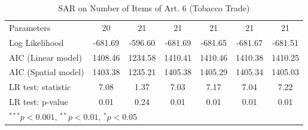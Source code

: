 \begin{table}[!h]
\begin{center}
\begin{tabular}{l c c c c c c }
Parameters              & 20           & 21            & 21           & 21           & 21           & 21           \\
Log Likelihood          & -681.69      & -596.60       & -681.69      & -681.65      & -681.67      & -681.51      \\
AIC (Linear model)      & 1408.46      & 1234.58       & 1410.41      & 1410.46      & 1410.38      & 1410.25      \\
AIC (Spatial model)     & 1403.38      & 1235.21       & 1405.38      & 1405.29      & 1405.34      & 1405.03      \\
LR test: statistic      & 7.08         & 1.37          & 7.03         & 7.17         & 7.04         & 7.22         \\
LR test: p-value        & 0.01         & 0.24          & 0.01         & 0.01         & 0.01         & 0.01         \\
\bottomrule
\multicolumn{7}{l}{\scriptsize{$^{***}p<0.001$, $^{**}p<0.01$, $^*p<0.05$}}
\end{tabular}
\caption{SAR on Number of Items of Art. 6 (Tobacco Trade)}
\label{table:coefficients}
\end{center}
\end{table}
